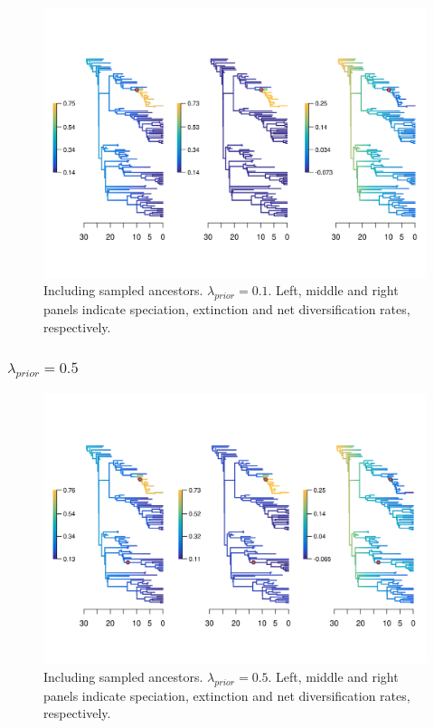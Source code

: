 \documentclass[a4paper, 12pt]{article}
\begin{document}
\begin{figure}[H]
  \centering
  \includegraphics[width = \linewidth]{figures/diversification/sensitivity-analyses-with-sampled-ancestors/shifts-0-1/sensitivity-analysis-with-sampled-ancestors-0-1.png}
  \caption{Including sampled ancestors. $\lambda_{prior} = 0.1$. Left, middle and right panels indicate speciation, extinction and net diversification rates, respectively.}
  \label{fig-full-0-1}
\end{figure}

\subsubsection{$\lambda_{prior} = 0.5$}

\begin{figure}[H]
  \centering
  \includegraphics[width = \linewidth]{figures/diversification/sensitivity-analyses-with-sampled-ancestors/shifts-0-5/sensitivity-analysis-with-sampled-ancestors-0-5.png}
  \caption{Including sampled ancestors. $\lambda_{prior} = 0.5$. Left, middle and right panels indicate speciation, extinction and net diversification rates, respectively.}
  \label{fig-full-0-5}
\end{figure}
\end{document}
